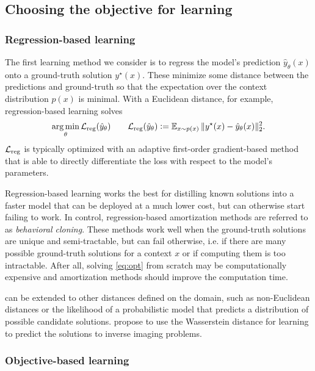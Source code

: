\documentclass[twoside,11pt]{article}
\newcommand{\ie}{i.e.\xspace}
\begin{document}
\subsection{Choosing the objective for learning}
\subsubsection{Regression-based learning}
\label{sec:learning:reg}
The first learning method we consider is to regress the
model's prediction $\hat y_\theta(x)$ onto a
ground-truth solution $y^\star(x)$.
These minimize some distance between the predictions
and ground-truth so that the expectation over
the context distribution $p(x)$ is minimal.
With a Euclidean distance, for example,
regression-based learning solves
\begin{equation}
  \operatorname*{arg\,min}_\theta {\mathcal{L}}_{\rm reg}(\hat y_\theta) \qquad
  {\mathcal{L}}_{\rm reg}(\hat y_\theta) \vcentcolon=
  \operatorname{\mathbb{E}}_{x \sim p(x)} \|y^\star(x) - \hat y_\theta(x) \|_2^2.
\label{eq:reg-loss}
\end{equation}
${\mathcal{L}}_{\rm reg}$ is typically optimized with an adaptive first-order
gradient-based method that is able to directly differentiate
the loss with respect to the model's parameters.

Regression-based learning works the best for distilling
known solutions into a faster model that can be deployed
at a much lower cost, but can otherwise start failing to work.
In control, regression-based amortization
methods are referred to as \emph{behavioral cloning}.
These methods work well when the ground-truth solutions
are unique and semi-tractable, but can fail otherwise,
\ie if there are many possible ground-truth
solutions for a context $x$ or if computing them
is too intractable.
After all, solving \cref{eq:opt} from scratch may be
computationally expensive and amortization methods
should improve the computation time.

\begin{remark}
   can be extended to other distances
  defined on the domain, such as non-Euclidean distances
  or the likelihood of a probabilistic model that predicts
  a distribution of possible candidate solutions.
  \citet{adler2017learning} propose to use the Wasserstein
  distance for learning to predict the solutions to
  inverse imaging problems.
\end{remark}

\subsubsection{Objective-based learning}
\label{sec:learning:grad}
\end{document}
